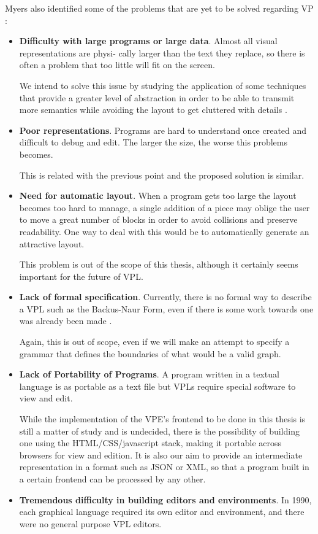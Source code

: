 Myers also identified some of the problems that are yet to be solved
regarding VP \cite{Myers1990}:

\begin{itemize}
  \item \textbf{Difficulty with large programs or large data}. Almost all visual representations are physi-
cally larger than the text they replace, so there is often a problem that too little will fit on
the screen.

We intend to solve this issue by studying the application of some techniques
that provide a greater level of abstraction in order to be able to transmit
more semantics while avoiding the layout to get cluttered with details \cite{Burnett1995}.
  \item \textbf{Poor representations}. Programs are hard to understand once created and
difficult to debug and edit. The larger the size, the worse this problems becomes.

This is related with the previous point and the proposed solution is similar.
  \item \textbf{Need for automatic layout}. When a program gets too large the layout
becomes too hard to manage, a single addition of a piece may oblige the user
to move a great number of blocks in order to avoid collisions and preserve
readability. One way to deal with this would be to automatically generate an
attractive layout.

This problem is out of the scope of this thesis, although
it certainly seems important for the future of VPL.
  \item \textbf{Lack of formal specification}. Currently, there is no formal way to describe
a VPL such as the Backus-Naur Form, even if there is some work towards one was
already been made \cite{selker1988elements}.

Again, this is out of scope, even
if we will make an attempt to specify a grammar that defines the boundaries of
what would be a valid graph.
  \item \textbf{Lack of Portability of Programs}. A program written in a textual language
is as portable as a text file but VPLs require special software to view and edit.

While the implementation of the VPE's frontend to be done in this thesis is still a matter
of study and is undecided, there is the possibility of building one using the
HTML/CSS/javascript stack, making it portable across browsers for view and edition.
It is also our aim to provide an intermediate representation in a
format such as JSON or XML, so that a program built in a certain frontend can
be processed by any other.
  \item \textbf{Tremendous difficulty in building editors and environments}.
In 1990, each graphical language required its own editor and environment, and there were no general purpose
VPL editors.


\end{itemize}
